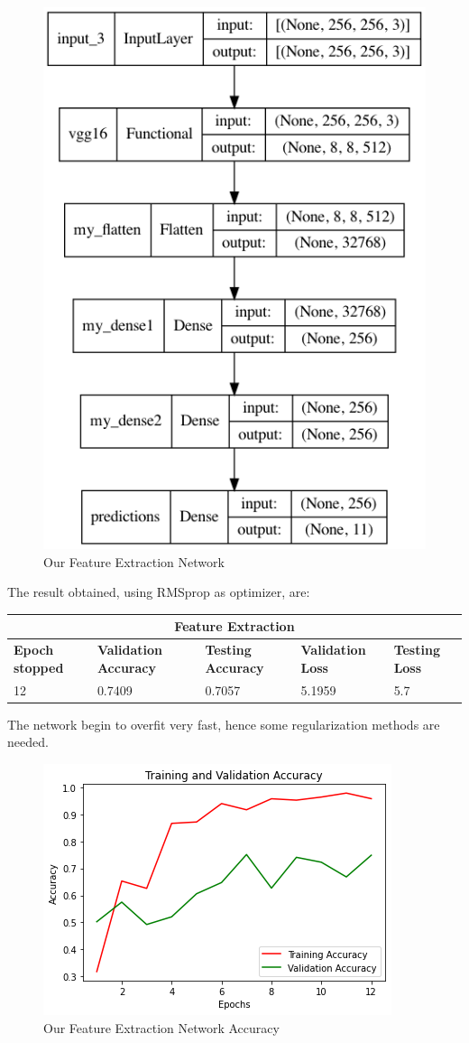 \begin{figure}[H]
	\centering
	\includegraphics[height=0.5\textwidth]{img/vgg16fe1.png}
	\caption{Our Feature Extraction Network}
	\label{fig:vgg16fe1}
\end{figure}


\noindent The result obtained, using RMSprop as optimizer, are:

\medskip

\begin{tabular}{ |p{2cm}|p{2cm}|p{2cm}|p{2cm}|p{2cm}|  }
\hline
\multicolumn{5}{|c|}{Feature Extraction} \\
\hline
\textbf{Epoch stopped} & \textbf{Validation Accuracy} & \textbf{Testing Accuracy} & \textbf{Validation Loss} & \textbf{Testing Loss} \\
\hline
12 & 0.7409 & 0.7057 & 5.1959 & 5.7\\
\hline
\end{tabular}

\medskip

 \noindent The network begin to overfit very fast, hence some regularization methods are needed.


\begin{figure}[H]
	\centering
	\includegraphics[height=0.45\textwidth]{img/vgg16fe1acc.png}
	\caption{Our Feature Extraction Network Accuracy}
	\label{fig:vgg16fe1acc}
\end{figure}

